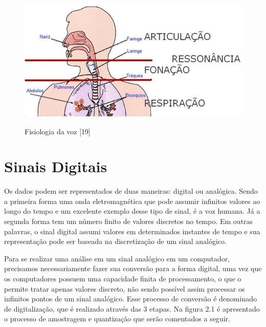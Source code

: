 \documentclass[a4paper,12pt,twoside,openright]{report}
\begin{document}
\begin{figure}[h]
	\caption{Fisiologia da voz [19]}
	
	\flushright %
	\includegraphics[width=13cm]{figuras/fisiologia-da-voz.png} %
	\label{figura:trato_vocal}
\end{figure}

\section{Sinais Digitais}
\label{sinais_digitais}
\par Os dados podem ser representados de duas maneiras: digital ou anal\'{o}gica. Sendo a primeira forma uma onda eletromagn\'{e}tica que pode assumir infinitos valores ao longo do tempo e um excelente exemplo desse tipo de sinal, \'{e} a voz humana. J\'{a} a segunda forma tem um n\'{u}mero finito de valores discretos no tempo. Em outras palavras, o sinal digital assumi valores em determinados instantes de tempo e sua representa{\c c}\~{a}o pode ser baseada na discretiza{\c c}\~{a}o de um sinal anal\'{o}gico.

\par Para se realizar uma an\'{a}lise em um sinal anal\'{o}gico em um computador, precisamos necessariamente fazer sua convers\~{a}o para a forma digital, uma vez que os computadores possuem uma capacidade finita de processamento, o que o permite tratar apenas valores discreto, n\~{a}o sendo poss\'{i}vel assim processar os infinitos pontos de um sinal anal\'{o}gico. Esse processo de convers\~{a}o \'{e} denominado de digitaliza{\c c}\~{a}o, que \'{e} realizado atrav\'{e}s das 3 etapas. Na figura 2.1 \'{e} apresentado o processo de amostragem e quantiza{\c c}\~{a}o que ser\~{a}o comentados a seguir.
\end{document}
